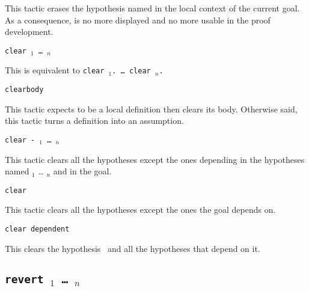 \begin{coq_example*}
This tactic erases the hypothesis named {\ident} in the local context
of the current goal. As a consequence, {\ident} is no more displayed and no more
usable in the proof development.

\begin{ErrMsgs}
\item {}
\item {}
\item {}
\end{ErrMsgs}

\begin{Variants}

\item {\tt clear {\ident$_1$} \dots\ {\ident$_n$}}

  This is equivalent to {\tt clear {\ident$_1$}. {\ldots} clear
    {\ident$_n$}.}

\item {\tt clearbody {\ident}}

  This tactic expects {\ident} to be a local definition then clears
  its body. Otherwise said, this tactic turns a definition into an
  assumption.

  \ErrMsg {}

\item \texttt{clear - {\ident$_1$} \dots\ {\ident$_n$}}

  This tactic clears all the hypotheses except the ones depending in
  the hypotheses named {\ident$_1$} {\ldots} {\ident$_n$} and in the
  goal.

\item \texttt{clear}

  This tactic clears all the hypotheses except the ones the goal depends on.

\item {\tt clear dependent \ident {}}

 This clears the hypothesis \ident\ and all the hypotheses
 that depend on it.

\end{Variants}

\subsection{\tt revert \ident$_1$ \dots\ \ident$_n$}
\label{revert}


\end{coq_example*}
